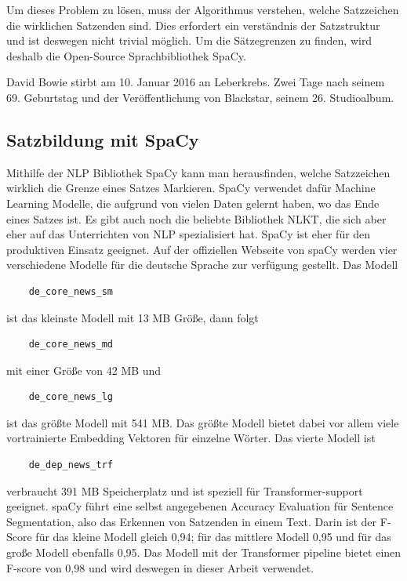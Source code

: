 Um dieses Problem zu lösen, muss der Algorithmus verstehen, welche Satzzeichen die wirklichen Satzenden sind.
Dies erfordert ein verständnis der Satzstruktur und ist deswegen nicht trivial möglich.
Um die Sätzegrenzen zu finden, wird deshalb die Open-Source Sprachbibliothek SpaCy.\cite{honnibal2017}

David Bowie stirbt am 10. Januar 2016 an Leberkrebs.
Zwei Tage nach seinem 69. Geburtstag und der Veröffentlichung von Blackstar, seinem 26. Studioalbum.

\subsection{Satzbildung mit SpaCy}

Mithilfe der NLP Bibliothek SpaCy kann man herausfinden, welche Satzzeichen wirklich die Grenze eines Satzes Markieren.
SpaCy verwendet dafür Machine Learning Modelle, die aufgrund von vielen Daten gelernt haben, wo das Ende eines Satzes ist.
Es gibt auch noch die beliebte Bibliothek NLKT, die sich aber eher auf das Unterrichten von NLP spezialisiert hat.
SpaCy ist eher für den produktiven Einsatz geeignet.
Auf der offiziellen Webseite von spaCy werden vier verschiedene Modelle für die deutsche Sprache zur verfügung gestellt.
Das Modell 
\begin{verbatim}
    de_core_news_sm 
\end{verbatim} 
ist das kleinste Modell mit 13 MB Größe, dann folgt 
\begin{verbatim} 
    de_core_news_md 
\end{verbatim}
mit einer Größe von 42 MB und 
\begin{verbatim}
    de_core_news_lg 
\end{verbatim}
ist das größte Modell mit 541 MB.
Das größte Modell bietet dabei vor allem viele vortrainierte Embedding Vektoren für einzelne Wörter.
Das vierte Modell ist 
\begin{verbatim}
    de_dep_news_trf
\end{verbatim}
verbraucht 391 MB Speicherplatz und ist speziell für Transformer-support geeignet.
spaCy führt eine selbst angegebenen Accuracy Evaluation für Sentence Segmentation, also das Erkennen von Satzenden in einem Text.
Darin ist der F-Score für das kleine Modell gleich 0,94; für das mittlere Modell 0,95 und für das große Modell ebenfalls 0,95.
Das Modell mit der Transformer pipeline bietet einen F-score von 0,98 und wird deswegen in dieser Arbeit verwendet. \cite{spacy2024}


